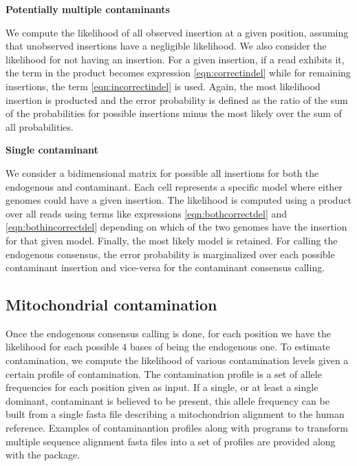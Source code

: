 \documentclass[a4paper,12pt]{article}
\begin{document}
{\bf Potentially multiple contaminants}

We compute the likelihood of all observed insertion at a given position, assuming that unobserved insertions have a negligible likelihood. We also consider the likelihood for not having an insertion. For a given insertion, if a read exhibits it, the term in the product becomes expression \ref{eqn:correctindel} while for remaining insertions, the term \ref{eqn:incorrectindel} is used. Again, the most likelihood insertion is producted and the error probability is defined as the ratio of the sum of the probabilities for possible insertions minus the most likely over the sum of all probabilities.

{\bf Single contaminant}

We consider a bidimensional matrix for possible all insertions for both the endogenous and contaminant. Each cell represents a specific model where either genomes could have a given insertion. The likelihood is computed using a product over all reads using terms like expressions \ref{eqn:bothcorrectdel} and \ref{eqn:bothincorrectdel} depending on which of the two genomes have the insertion for that given model. Finally, the most likely model is retained. For calling the endogenous consensus, the error probability is marginalized over each possible contaminant insertion and vice-versa for the contaminant consensus calling. 








\subsection{Mitochondrial contamination}
\label{sec:contest}

Once the endogenous consensus calling is done, for each position we have the likelihood for each possible 4 bases of being the endogenous one. To estimate contamination, we compute the likelihood of various contamination levels given a certain profile of contamination. The contamination profile is a set of allele frequencies for each position given as input. If a single, or at least a single dominant, contaminant is believed to be present, this allele frequency can be built from a single fasta file describing a mitochondrion alignment to the human reference.  Examples of contaminantion profiles along with programs to transform multiple sequence alignment fasta files into a set of profiles are provided along with the package. 
\end{document}
